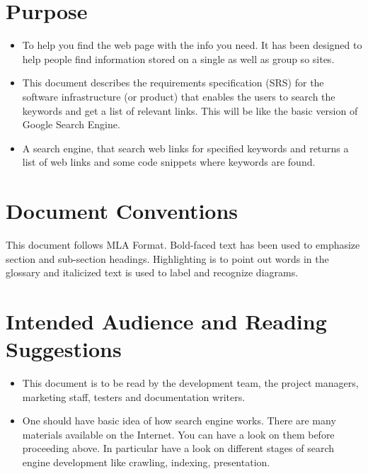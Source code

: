 \documentclass{scrreprt}
\begin{document}
\section{Purpose}

\begin{itemize}
  \item To help you find the web page with the info you need. It has been designed to help people find information stored on a single as well as group so sites.
  \item This document describes the requirements specification (SRS) for the software infrastructure (or product) that enables the users to search the keywords and get a list of relevant links. This will be like the basic version of Google Search Engine.
 \item A search engine, that search web links for specified keywords and returns a list of web links and some code snippets where keywords are found.

\end{itemize}

\section{Document Conventions}
This document follows MLA Format. Bold-faced text has been used to emphasize section and sub-section headings. Highlighting is to point out words in the glossary and italicized text is used to label and recognize diagrams.

\section{Intended Audience and Reading Suggestions}
\begin{itemize}
  \item This document is to be read by the development team, the project managers, marketing staff, testers and documentation writers.
  \item One should have basic idea of how search engine works. There are many materials available on the Internet. You can have a look on them before proceeding above. In particular have a look on different stages of search engine development like crawling, indexing, presentation.

\end{itemize}
\end{document}
